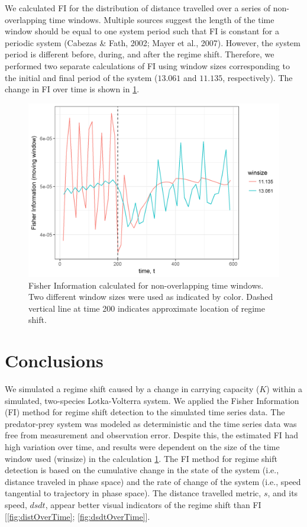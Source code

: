 \documentclass[12pt,twoside,openany]{reedthesis}
\begin{document}
We calculated FI for the distribution of distance travelled over a series of non-overlapping time windows. Multiple sources suggest the length of the time window should be equal to one system period such that FI is constant for a periodic system (Cabezas \& Fath, 2002; Mayer et al., 2007). However, the system period is different before, during, and after the regime shift. Therefore, we performed two separate calculations of FI using window sizes corresponding to the initial and final period of the system (\(13.061\) and \(11.135\), respectively). The change in FI over time is shown in \ref{fig:fiOverTime}.
\begin{figure}

{\centering \includegraphics[width=0.85\linewidth]{./chapterFiles/fiGuide/figures/fiOverTime} 

}

\caption{Fisher Information calculated for non-overlapping time windows. Two different window sizes were used as indicated by color. Dashed vertical line at time 200 indicates approximate location of regime shift.}\label{fig:fiOverTime}
\end{figure}
\hypertarget{conclusions}{%
\section{Conclusions}\label{conclusions}}

We simulated a regime shift caused by a change in carrying capacity (\(K\)) within a simulated, two-species Lotka-Volterra system. We applied the Fisher Information (FI) method for regime shift detection to the simulated time series data. The predator-prey system was modeled as deterministic and the time series data was free from measurement and observation error. Despite this, the estimated FI had high variation over time, and results were dependent on the size of the time window used (winsize) in the calculation \ref{fig:fiOverTime}. The FI method for regime shift detection is based on the cumulative change in the state of the system (i.e., distance traveled in phase space) and the rate of change of the system (i.e., speed tangential to trajectory in phase space). The distance travelled metric, \(s\), and its speed, \(dsdt\), appear better visual indicators of the regime shift than FI {[}\ref{fig:distOverTime}; \ref{fig:dsdtOverTime}{]}.
\end{document}
